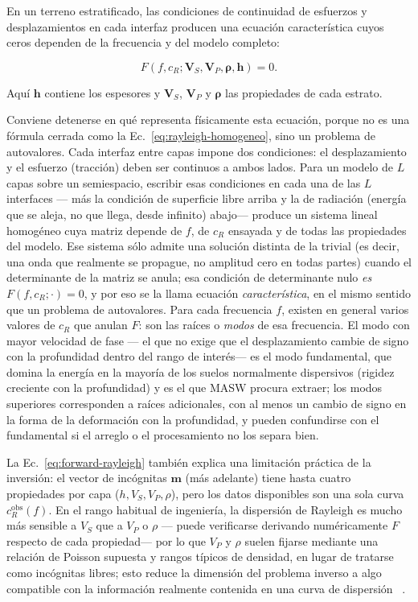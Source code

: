 En un terreno estratificado, las condiciones de continuidad de esfuerzos y
desplazamientos en cada interfaz producen una ecuación característica cuyos ceros
dependen de la frecuencia y del modelo completo:

\begin{equation}
    F\!\left(f,c_R;\boldsymbol{V}_S,\boldsymbol{V}_P,
    \boldsymbol{\rho},\boldsymbol{h}\right)=0.
    \label{eq:forward-rayleigh}
\end{equation}

Aquí $\boldsymbol{h}$ contiene los espesores y $\boldsymbol{V}_S$,
$\boldsymbol{V}_P$ y $\boldsymbol{\rho}$ las propiedades de cada estrato.

Conviene detenerse en qué representa físicamente esta ecuación, porque no es una
fórmula cerrada como la Ec.~\eqref{eq:rayleigh-homogeneo}, sino un problema de
autovalores. Cada interfaz entre capas impone dos condiciones: el desplazamiento y el
esfuerzo (tracción) deben ser continuos a ambos lados. Para un modelo de $L$ capas sobre
un semiespacio, escribir esas condiciones en cada una de las $L$ interfaces --- más la
condición de superficie libre arriba y la de radiación (energía que se aleja, no que
llega, desde infinito) abajo--- produce un sistema lineal homogéneo cuya matriz depende
de $f$, de $c_R$ ensayada y de todas las propiedades del modelo. Ese sistema sólo admite
una solución distinta de la trivial (es decir, una onda que realmente se propague, no
amplitud cero en todas partes) cuando el determinante de la matriz se anula; esa
condición de determinante nulo \emph{es} $F(f,c_R;\cdot)=0$, y por eso se la llama
ecuación \emph{característica}, en el mismo sentido que un problema de autovalores. Para
cada frecuencia $f$, existen en general varios valores de $c_R$ que anulan $F$: son las
raíces o \emph{modos} de esa frecuencia. El modo con mayor velocidad de fase --- el que
no exige que el desplazamiento cambie de signo con la profundidad dentro del rango de
interés--- es el modo fundamental, que domina la energía en la mayoría de los suelos
normalmente dispersivos (rigidez creciente con la profundidad) y es el que MASW procura
extraer; los modos superiores corresponden a raíces adicionales, con al menos un cambio
de signo en la forma de la deformación con la profundidad, y pueden confundirse con el
fundamental si el arreglo o el procesamiento no los separa bien.

La Ec.~\eqref{eq:forward-rayleigh} también explica una limitación práctica de la
inversión: el vector de incógnitas $\boldsymbol{m}$ (más adelante) tiene hasta cuatro
propiedades por capa ($h,V_S,V_P,\rho$), pero los datos disponibles son una sola curva
$c_R^{\mathrm{obs}}(f)$. En el rango habitual de ingeniería, la dispersión de Rayleigh es
mucho más sensible a $V_S$ que a $V_P$ o $\rho$ --- puede verificarse derivando
numéricamente $F$ respecto de cada propiedad--- por lo que $V_P$ y $\rho$ suelen fijarse
mediante una relación de Poisson supuesta y rangos típicos de densidad, en lugar de
tratarse como incógnitas libres; esto reduce la dimensión del problema inverso a algo
compatible con la información realmente contenida en una curva de dispersión
~\cite{Xia1999}.

